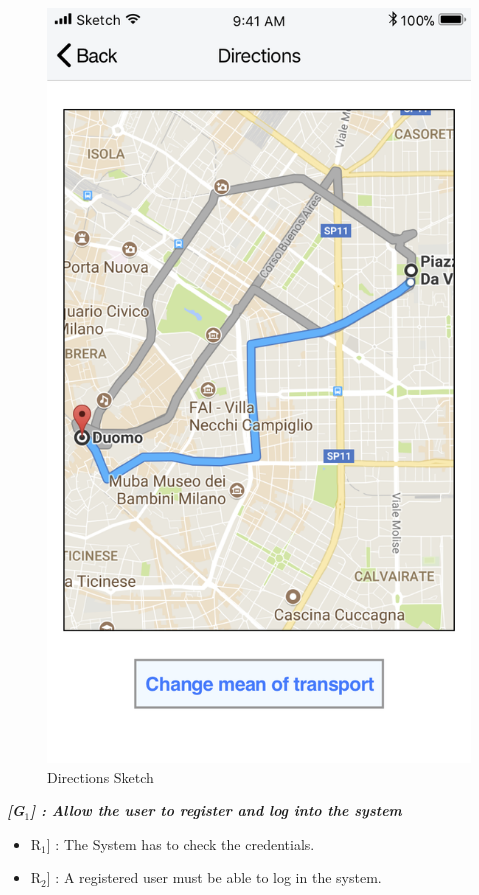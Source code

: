 \begin{enumerate}
\begin{figure}[H]
				\centering
				\includegraphics[scale=0.25]{Images/Sketch/Directions}
				\caption{Directions Sketch}
			\end{figure}
\end{enumerate}

\vspace{0.5cm}
\noindent
\emph{\textbf{[G$_{1}$] : Allow the user to register and log into the system}}
\begin{itemize}
	\setlength{\leftskip}{0.5cm}
	\item \lbrack R$_{1}$] : The System has to check the credentials.
	\item \lbrack R$_{2}$] : A registered user must be able to log in the system.
\end{itemize}

